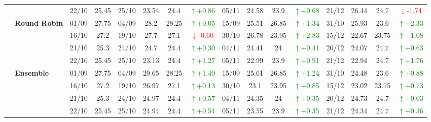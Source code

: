 \documentclass{ieeeaccess}
\begin{document}
{\begin{longtable}{llcc|cccc|cccc|cccc}
&
& 22/10 & 25.45 & 25/10 & 23.54 & 24.4 & \textcolor{green}{\(\uparrow\)+0.86} & 05/11 & 24.58 & 23.9 & \textcolor{green}{\(\uparrow\)+0.68} & 21/12 & 26.44 & 24.7 & \textcolor{red}{\(\downarrow\)-1.74} \\
\cmidrule(lr){2-16}


& \textbf{Round Robin}
& 01/09 & 27.75 & 04/09 & 28.2 & 28.25 & \textcolor{green}{\(\uparrow\)+0.05} & 15/09 & 25.51 & 26.85 & \textcolor{green}{\(\uparrow\)+1.34} & 31/10 & 25.93 & 23.6 & \textcolor{green}{\(\uparrow\)+2.33} \\

&
& 16/10 & 27.2 & 19/10 & 27.7 & 27.1 & \textcolor{red}{\(\downarrow\)-0.60} & 30/10 & 26.78 & 23.95 & \textcolor{green}{\(\uparrow\)+2.83} & 15/12 & 22.67 & 23.75 & \textcolor{green}{\(\uparrow\)+1.08} \\

&
& 21/10 & 25.3 & 24/10 & 24.7 & 24.4 & \textcolor{green}{\(\uparrow\)+0.30} & 04/11 & 24.41 & 24 & \textcolor{green}{\(\uparrow\)+0.41} & 20/12 & 24.07 & 24.7 & \textcolor{green}{\(\uparrow\)+0.63} \\

&
& 22/10 & 25.45 & 25/10 & 23.13 & 24.4 & \textcolor{green}{\(\uparrow\)+1.27} & 05/11 & 22.99 & 23.9 & \textcolor{green}{\(\uparrow\)+0.91} & 21/12 & 22.94 & 24.7 & \textcolor{green}{\(\uparrow\)+1.76} \\
\cmidrule(lr){2-16}



& \textbf{Ensemble}
& 01/09 & 27.75 & 04/09 & 29.65 & 28.25 & \textcolor{green}{\(\uparrow\)+1.40} & 15/09 & 25.61 & 26.85 & \textcolor{green}{\(\uparrow\)+1.24} & 31/10 & 24.48 & 23.6 & \textcolor{green}{\(\uparrow\)+0.88} \\

&
& 16/10 & 27.2 & 19/10 & 26.97 & 27.1 & \textcolor{green}{\(\uparrow\)+0.13} & 30/10 & 23.1 & 23.95 & \textcolor{green}{\(\uparrow\)+0.85} & 15/12 & 23.02 & 23.75 & \textcolor{green}{\(\uparrow\)+0.73} \\

&
& 21/10 & 25.3 & 24/10 & 24.97 & 24.4 & \textcolor{green}{\(\uparrow\)+0.57} & 04/11 & 24.35 & 24 & \textcolor{green}{\(\uparrow\)+0.35} & 20/12 & 24.73 & 24.7 & \textcolor{green}{\(\uparrow\)+0.03} \\

&
& 22/10 & 25.45 & 25/10 & 24.94 & 24.4 & \textcolor{green}{\(\uparrow\)+0.54} & 05/11 & 23.55 & 23.9 & \textcolor{green}{\(\uparrow\)+0.35} & 21/12 & 24.34 & 24.7 & \textcolor{green}{\(\uparrow\)+0.36} \\

\bottomrule
\end{longtable}
}
\end{document}

